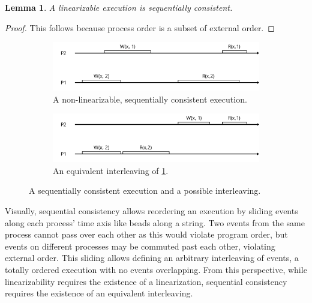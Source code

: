 \documentclass[]             %
{NASA}                       %
\newtheorem{lemma}[theorem]{Lemma}
\theoremstyle{definition}
\begin{document}
\begin{lemma}
  \label{lem:linearsequential}
  A linearizable execution is sequentially consistent.
\end{lemma}
\begin{proof}
  This follows because process order is a subset of external order.
\end{proof}

\begin{figure}
  \begin{subfigure}[a]{1\textwidth}
    \center
    \includegraphics[scale=0.4]{images/sequential1.png}
    \caption{A non-linearizable, sequentially consistent execution.}
    \label{fig:sequential1}
  \end{subfigure}
  \begin{subfigure}[b]{1\textwidth}
    \center
    \includegraphics[scale=0.4]{images/sequential2.png}
    \caption{An equivalent interleaving of \ref{fig:sequential1}.}
    \label{fig:interleaving1}
  \end{subfigure}
  \caption{A sequentially consistent execution and a possible interleaving.}
  \label{fig:sequential}
\end{figure}

Visually, sequential consistency allows reordering an execution by
sliding events along each process' time axis like beads along a string.
Two events from the same process cannot pass over each other as this
would violate program order, but events on different processes may be
commuted past each other, violating external order. This sliding allows
defining an arbitrary interleaving of events, a totally ordered
execution with no events overlapping. From this perspective, while
linearizability requires the existence of a linearization, sequential
consistency requires the existence of an equivalent interleaving.
\end{document}
